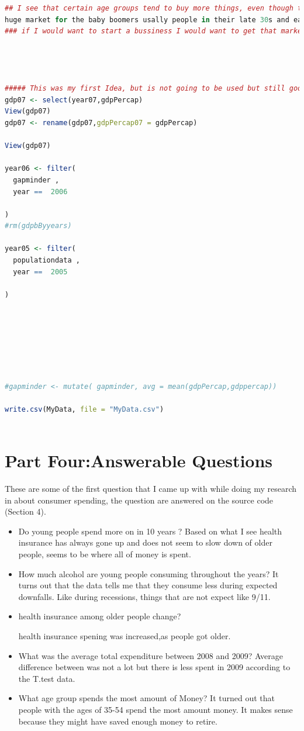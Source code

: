 \documentclass[11pt]{article}
\begin{document}
\begin{lstlisting}[language=R]
## I see that certain age groups tend to buy more things, even though there are is 
huge market for the baby boomers usally people in their late 30s and early 40 tend to spend the most
### if I would want to start a bussiness I would want to get that markets. 




##### This was my first Idea, but is not going to be used but still good code for future refrence
gdp07 <- select(year07,gdpPercap)
View(gdp07)
gdp07 <- rename(gdp07,gdpPercap07 = gdpPercap)

View(gdp07)
  
year06 <- filter(
  gapminder ,
  year ==  2006
  
)  
#rm(gdpbByyears)   

year05 <- filter(
  populationdata ,
  year ==  2005
  
)







#gapminder <- mutate( gapminder, avg = mean(gdpPercap,gdppercap))

write.csv(MyData, file = "MyData.csv")



\end{lstlisting}




\section{Part Four:Answerable Questions}


These are some of the first question that I came up with while doing my research in about consumer spending, the question are answered on the source code (Section 4).  
\begin{itemize}
\item Do young  people  spend more on in  10  years ?
Based on what I see health insurance has always gone up and does not seem to slow down of older people, seems to be where all of money is spent.
\item How much alcohol are young people consuming throughout the years? It turns out that the data tells me that they consume less during expected downfalls. Like during recessions, things that are not expect like 9/11.  
\item health insurance among older people change?  

health insurance spening was increased,as people got older. 

\item  What was the average total expenditure between 2008 and 2009? Average difference between was not a lot but there is less spent in 2009 according to the T.test data.
\item What age group spends the most amount of Money?
It turned out that people with the ages of 35-54 spend the most amount money. It makes sense because they might have saved enough money to retire. 


\end{itemize}
\end{document}
